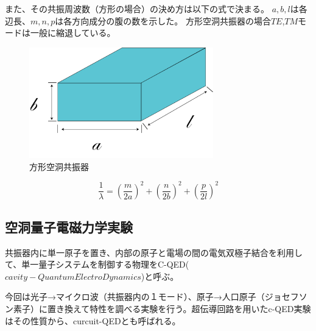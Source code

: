 また、その共振周波数（方形の場合）の決め方は以下の式で決まる。
$a,b,l$は各辺長、$m,n,p$は各方向成分の腹の数を示した。
方形空洞共振器の場合$TE$,$TM$モードは一般に縮退している。

\vspace{10 mm}

\begin{figure}[h]
  \begin{center}
    \includegraphics[width=8cm]{./image/空洞共振器.png}
    \caption{方形空洞共振器}
    \label{fig:Cavity}
  \end{center}
\end{figure}

\[
 \frac{1}{\lambda} = (\frac{m}{2a})^2 + (\frac{n}{2b})^2 + (\frac{p}{2l})^2
\]

\subsection{空洞量子電磁力学実験}
共振器内に単一原子を置き、内部の原子と電場の間の電気双極子結合を利用して、単一量子システムを制御する物理をC-QED($cavity - Quantum ElectroDynamics$)と呼ぶ。

今回は光子→マイクロ波（共振器内の１モード）、原子→人口原子（ジョセフソン素子）に置き換えて特性を調べる実験を行う。超伝導回路を用いたc-QED実験はその性質から、curcuit-QEDとも呼ばれる。

